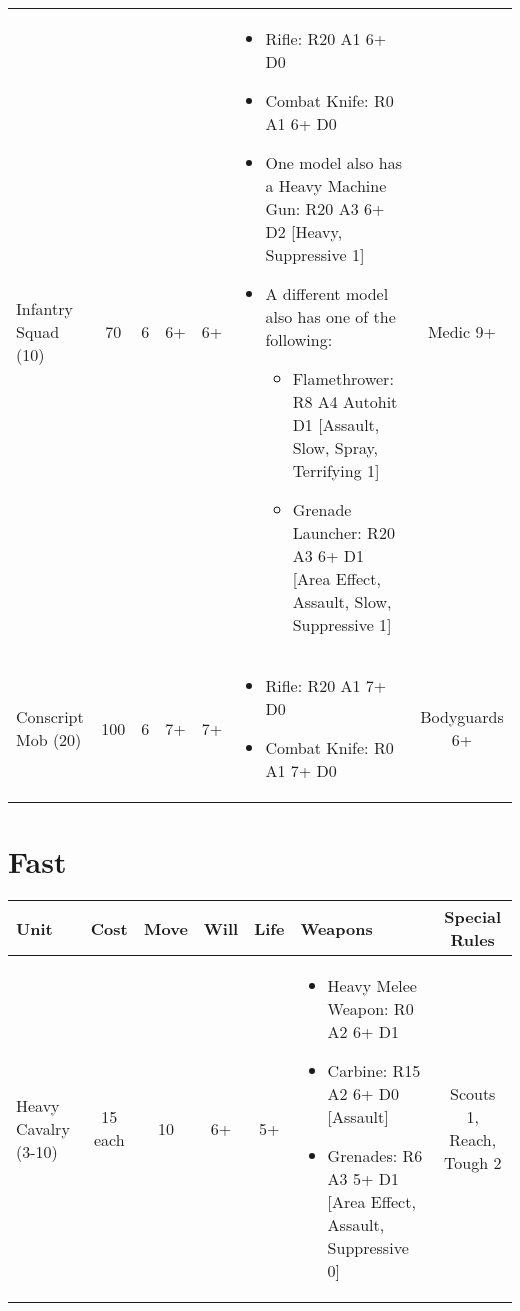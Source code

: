 \documentclass[landscape]{extarticle}
\begin{document}
\begin{small}
\begin{tabular}{UccccWS}
Infantry Squad (10)
&
70
&
6
&
6+
&
6+
&
\begin{itemize}
    \item Rifle: R20 A1 6+ D0
    \item Combat Knife: R0 A1 6+ D0
    \item One model also has a Heavy Machine Gun: R20 A3 6+ D2 [Heavy, Suppressive 1]
    \item A different model also has one of the following:
    \begin{itemize}
        \item Flamethrower: R8 A4 Autohit D1 [Assault, Slow, Spray, Terrifying 1]
        \item Grenade Launcher: R20 A3 6+ D1 [Area Effect, Assault, Slow, Suppressive 1]
    \end{itemize}
\end{itemize}
&
Medic 9+



\\


Conscript Mob (20)
&
100
&
6
&
7+
&
7+
&
\begin{itemize}
    \item Rifle: R20 A1 7+ D0
    \item Combat Knife: R0 A1 7+ D0
\end{itemize}
&
Bodyguards 6+
\end{tabular}







\section*{Fast}

\begin{tabular}{UccccWS}

\textbf{Unit} & \textbf{Cost} & \textbf{Move} & \textbf{Will} & \textbf{Life} & \textbf{Weapons} & \textbf{Special Rules} \\


\hline


Heavy Cavalry (3-10)
&
15 each
&
10
&
6+
&
5+
&
\begin{itemize}
    \item Heavy Melee Weapon: R0 A2 6+ D1
    \item Carbine: R15 A2 6+ D0 [Assault]
    \item Grenades: R6 A3 5+ D1 [Area Effect, Assault, Suppressive 0]
\end{itemize}
&
Scouts 1, Reach, Tough 2




\end{tabular}
\end{small}
\end{document}
